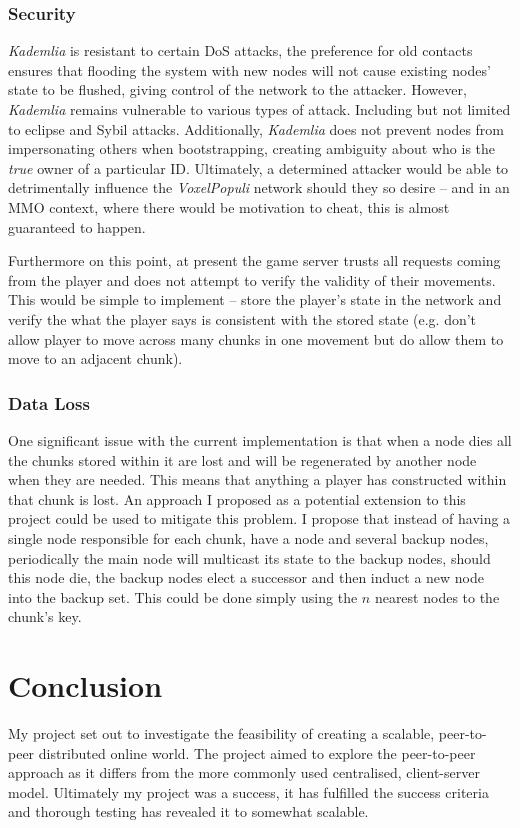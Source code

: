 \documentclass[10pt,twoside,notitlepage,a4paper]{report}
\newcommand{\kademlia}{\emph{Kademlia}}
\newcommand{\voxpop}{\emph{VoxelPopuli}}
\begin{document}
	\subsection{Security}
	\label{sec:security}
	\kademlia{} is resistant to certain DoS attacks, the preference for old contacts ensures that flooding the system with new nodes will not cause existing nodes' state to be flushed, giving control of the network to the attacker. However, \kademlia{} remains vulnerable to various types of attack. Including but not limited to eclipse and Sybil attacks. Additionally, \kademlia{} does not prevent nodes from impersonating others when bootstrapping, creating ambiguity about who is the \emph{true} owner of a particular ID. Ultimately, a determined attacker would be able to detrimentally influence the \voxpop{} network should they so desire -- and in an MMO context, where there would be motivation to cheat, this is almost guaranteed to happen.
	
	Furthermore on this point, at present the game server trusts all requests coming from the player and does not attempt to verify the validity of their movements. This would be simple to implement -- store the player's state in the network and verify the what the player says is consistent with the stored state (e.g. don't allow player to move across many chunks in one movement but do allow them to move to an adjacent chunk).
	
	\subsection{Data Loss}
	One significant issue with the current implementation is that when a node dies all the chunks stored within it are lost and will be regenerated by another node when they are needed. This means that anything a player has constructed within that chunk is lost. An approach I proposed as a potential extension to this project could be used to mitigate this problem. I propose that instead of having a single node responsible for each chunk, have a node and several backup nodes, periodically the main node will multicast its state to the backup nodes, should this node die, the backup nodes elect a successor and then induct a new node into the backup set. This could be done simply using the $n$ nearest nodes to the chunk's key.
	
	\cleardoublepage
	\chapter{Conclusion}
	My project set out to investigate the feasibility of creating a scalable, peer-to-peer distributed online world. The project aimed to explore the peer-to-peer approach as it differs from the more commonly used centralised, client-server model. Ultimately my project was a success, it has fulfilled the success criteria and thorough testing has revealed it to somewhat scalable.
	
\end{document}

